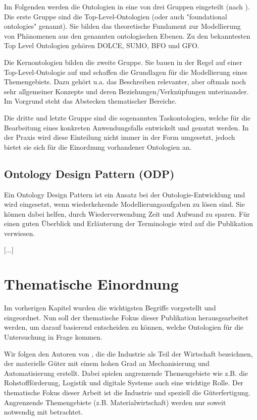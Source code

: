\documentclass{article}
\begin{document}
Im Folgenden werden die Ontologien in eine von drei Gruppen eingeteilt (nach \cite{hoehndorf2009developing}). Die erste Gruppe sind die Top-Level-Ontologien (oder auch "foundational ontologies" genannt). Sie bilden das theoretische Fundament zur Modellierung von Phänomenen aus den genannten ontologischen Ebenen. Zu den bekanntesten Top Level Ontologien gehören DOLCE, SUMO, BFO und GFO.

Die Kernontologien bilden die zweite Gruppe. Sie bauen in der Regel auf einer Top-Level-Ontologie auf und schaffen die Grundlagen für die Modellierung eines Themengebiets. Dazu gehört u.a. das Beschreiben relevanter, aber oftmals noch sehr allgemeiner Konzepte und deren Beziehungen/Verknüpfungen unterinander. Im Vorgrund steht das Abstecken thematischer Bereiche.

Die dritte und letzte Gruppe sind die sogenannten Taskontologien, welche für die Bearbeitung eines konkreten Anwendungsfalls entwickelt und genutzt werden. In der Praxis wird diese Einteilung nicht immer in der Form umgesetzt, jedoch bietet sie sich für die Einordnung vorhandener Ontologien an.

\subsection{Ontology Design Pattern (ODP)}


Ein Ontology Design Pattern ist ein Ansatz bei der Ontologie-Entwicklung und wird eingesetzt, wenn wiederkehrende Modellierungsaufgaben zu lösen sind.
Sie können dabei helfen, durch Wiederverwendung Zeit und Aufwand zu sparen.
Für einen guten Überblick und Erläuterung der Terminologie wird auf die Publikation \cite{falbo2013ontology} verwiesen.

[...]

\section{Thematische Einordnung}

Im vorherigen Kapitel wurden die wichtigsten Begriffe vorgestellt und eingeordnet.
Nun soll der thematische Fokus dieser Publikation herausgearbeitet werden, um darauf basierend entscheiden zu können, welche Ontologien für die Untersuchung in Frage kommen.

Wir folgen den Autoren von \cite{lasi2014industrie}, die die Industrie als Teil der Wirtschaft bezeichnen, der materielle Güter mit einem hohen Grad an Mechanisierung und Automatisierung erstellt.
Dabei spielen angrenzende Themengebiete wie z.B. die Rohstoffförderung, Logistik und digitale Systeme auch eine wichtige Rolle.
Der thematische Fokus dieser Arbeit ist die Industrie und speziell die Güterfertigung.
Angrenzende Themengebiete (z.B. Materialwirtschaft) werden nur soweit notwendig mit betrachtet.
\end{document}
